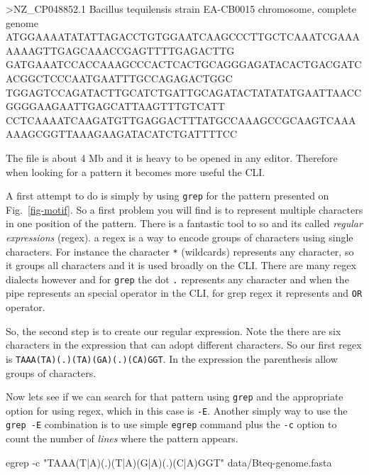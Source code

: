 \documentclass[
  letterpaper,
  DIV=11,
  numbers=noendperiod,
  oneside]{scrreprt}
\newenvironment{Shaded}{\begin{snugshade}}{\end{snugshade}}
\newcommand{\AttributeTok}[1]{\textcolor[rgb]{0.40,0.45,0.13}{#1}}
\newcommand{\ExtensionTok}[1]{\textcolor[rgb]{0.00,0.23,0.31}{#1}}
\newcommand{\FunctionTok}[1]{\textcolor[rgb]{0.28,0.35,0.67}{#1}}
\newcommand{\NormalTok}[1]{\textcolor[rgb]{0.00,0.23,0.31}{#1}}
\newcommand{\OperatorTok}[1]{\textcolor[rgb]{0.37,0.37,0.37}{#1}}
\newcommand{\StringTok}[1]{\textcolor[rgb]{0.13,0.47,0.30}{#1}}
\begin{document}
\begin{Shaded}
\begin{Highlighting}[]
\OperatorTok{\textgreater{}}\NormalTok{NZ\_CP048852.1 }\ExtensionTok{Bacillus}\NormalTok{ tequilensis strain EA{-}CB0015 chromosome, complete genome}
\ExtensionTok{ATGGAAAATATATTAGACCTGTGGAATCAAGCCCTTGCTCAAATCGAAAAAAAGTTGAGCAAACCGAGTTTTGAGACTTG}
\ExtensionTok{GATGAAATCCACCAAAGCCCACTCACTGCAGGGAGATACACTGACGATCACGGCTCCCAATGAATTTGCCAGAGACTGGC}
\ExtensionTok{TGGAGTCCAGATACTTGCATCTGATTGCAGATACTATATATGAATTAACCGGGGAAGAATTGAGCATTAAGTTTGTCATT}
\ExtensionTok{CCTCAAAATCAAGATGTTGAGGACTTTATGCCAAAGCCGCAAGTCAAAAAAGCGGTTAAAGAAGATACATCTGATTTTCC}
\end{Highlighting}
\end{Shaded}

The file is about 4 Mb and it is heavy to be opened in any editor.
Therefore when looking for a pattern it becomes more useful the CLI.

A first attempt to do is simply by using \texttt{grep} for the pattern
presented on Fig.~\ref{fig-motif}. So a first problem you will find is
to represent multiple characters in one position of the pattern. There
is a fantastic tool to so and its called \emph{regular expressions}
(regex). a regex is a way to encode groups of characters using single
characters. For instance the character \texttt{*} (wildcards) represents
any character, so it groups all characters and it is used broadly on the
CLI. There are many regex dialects however and for \texttt{grep} the dot
\texttt{.} represents any character and when the pipe
\texttt{\textbar{}} represents an special operator in the CLI, for grep
regex it represents and \texttt{OR} operator.

So, the second step is to create our regular expression. Note the there
are six characters in the expression that can adopt different
characters. So our first regex is
\texttt{TAAA(T\textbar{}A)(.)(T\textbar{}A)(G\textbar{}A)(.)(C\textbar{}A)GGT}.
In the expression the parenthesis allow groups of characters.

Now lets see if we can search for that pattern using \texttt{grep} and
the appropriate option for using regex, which in this case is
\texttt{-E}. Another simply way to use the \texttt{grep\ -E} combination
is to use simple \texttt{egrep} command plus the \texttt{-c} option to
count the number of \emph{lines} where the pattern appears.

\begin{Shaded}
\begin{Highlighting}[]
\FunctionTok{egrep} \AttributeTok{{-}c} \StringTok{"TAAA(T|A)(.)(T|A)(G|A)(.)(C|A)GGT"}\NormalTok{ data/Bteq{-}genome.fasta}
\end{Highlighting}
\end{Shaded}
\end{document}
